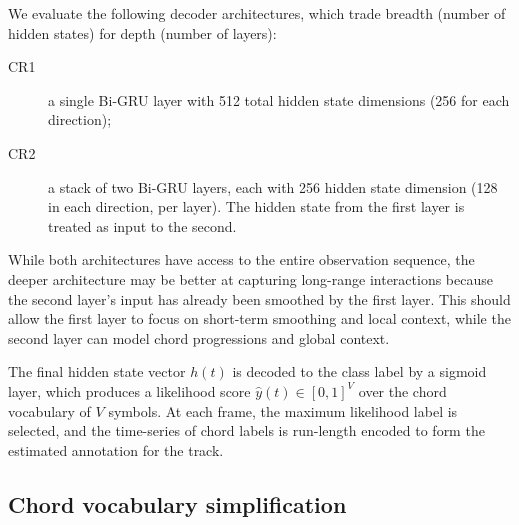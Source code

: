 \documentclass{article}
\begin{document}
We evaluate the following decoder architectures, which trade breadth (number of hidden states) for depth (number of layers):
\begin{description}
    \item[CR1] a single Bi-GRU layer with 512 total hidden state dimensions (256 for each direction);
    \item[CR2] a stack of two Bi-GRU layers, each with 256 hidden state dimension (128 in each direction, per layer). The hidden state from the first layer is treated as input to the second.
\end{description}
While both architectures have access to the entire observation sequence, the deeper architecture may be better at capturing long-range interactions because the second layer's input has already been smoothed by the first layer.
This should allow the first layer to focus on short-term smoothing and local context, while the second layer can model chord progressions and global context.

The final hidden state vector ${h(t)}$ is decoded to the class label by a sigmoid layer, which produces a likelihood score ${\hat{y}(t)} \in {[0, 1]}^{V}$ over the chord vocabulary of $V$ symbols.
At each frame, the maximum likelihood label is selected, and the time-series of chord labels is run-length encoded to form the estimated annotation for the track.


\subsection{Chord vocabulary simplification}

\label{sec:vocab}
%
\end{document}
